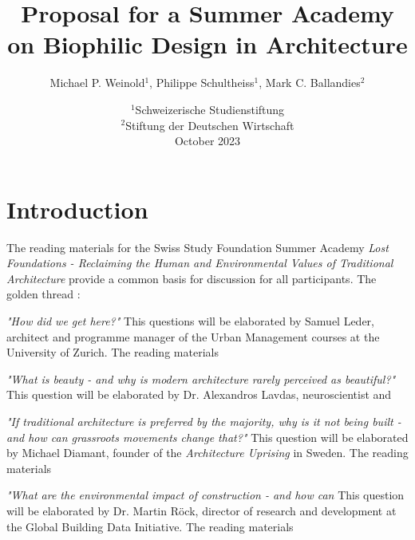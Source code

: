 \documentclass[a4paper]{article}
\title{Proposal for a Summer Academy \protect\\ on Biophilic Design in Architecture}
\author{Michael P. Weinold$^1$, Philippe Schultheiss$^1$, Mark C. Ballandies$^2$}
\date{
    $^1$Schweizerische Studienstiftung \\
    $^2$Stiftung der Deutschen Wirtschaft \\[3mm]
    October 2023
}
\begin{document}


\clearpage

\section*{\centering Introduction}

The reading materials for the Swiss Study Foundation Summer Academy \textit{Lost Foundations - Reclaiming the Human and Environmental Values of Traditional Architecture} provide a common basis for discussion for all participants. The golden thread :

\textit{"How did we get here?"} This questions will be elaborated by Samuel Leder, architect and programme manager of the Urban Management courses at the University of Zurich. The reading materials 

\textit{"What is beauty - and why is modern architecture rarely perceived as beautiful?"} This question will be elaborated by Dr. Alexandros Lavdas, neuroscientist and 

\textit{"If traditional architecture is preferred by the majority, why is it not being built - and how can grassroots movements change that?"} This question will be elaborated by Michael Diamant, founder of the \textit{Architecture Uprising} in Sweden. The reading materials 

\textit{"What are the environmental impact of construction - and how can } This question will be elaborated by Dr. Martin Röck, director of research and development at the Global Building Data Initiative. The reading materials  

\end{document}
